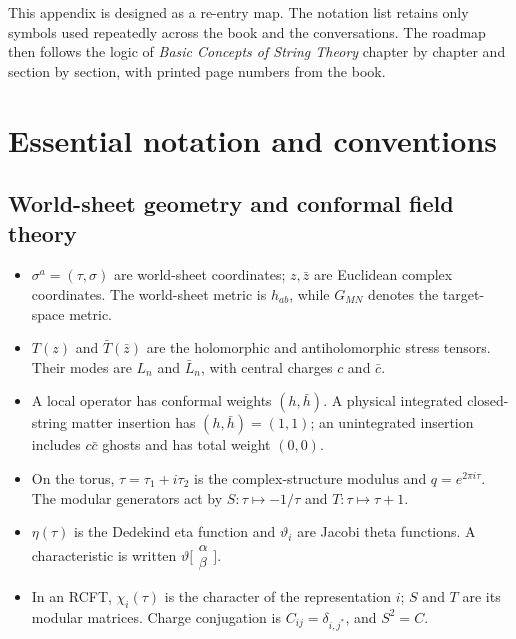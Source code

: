 \documentclass[
  10pt,
  a4paper,
  openany]{book}
\providecommand{\tightlist}{%
  \setlength{\itemsep}{0pt}\setlength{\parskip}{0pt}}
\begin{document}
This appendix is designed as a re-entry map. The notation list retains
only symbols used repeatedly across the book and the conversations. The
roadmap then follows the logic of \emph{Basic Concepts of String Theory}
chapter by chapter and section by section, with printed page numbers
from the book.

\section{Essential notation and
conventions}\label{essential-notation-and-conventions}

\subsection{World-sheet geometry and conformal field
theory}\label{world-sheet-geometry-and-conformal-field-theory}

\begin{itemize}
\tightlist
\item
  \(\sigma^a=(\tau,\sigma)\) are world-sheet coordinates; \(z,\bar z\)
  are Euclidean complex coordinates. The world-sheet metric is
  \(h_{ab}\), while \(G_{MN}\) denotes the target-space metric.
\item
  \(T(z)\) and \(\bar T(\bar z)\) are the holomorphic and
  antiholomorphic stress tensors. Their modes are \(L_n\) and
  \(\bar L_n\), with central charges \(c\) and \(\bar c\).
\item
  A local operator has conformal weights \((h,\bar h)\). A physical
  integrated closed-string matter insertion has \((h,\bar h)=(1,1)\); an
  unintegrated insertion includes \(c\bar c\) ghosts and has total
  weight \((0,0)\).
\item
  On the torus, \(\tau=\tau_1+i\tau_2\) is the complex-structure modulus
  and \(q=e^{2\pi i\tau}\). The modular generators act by
  \(S:\tau\mapsto-1/\tau\) and \(T:\tau\mapsto\tau+1\).
\item
  \(\eta(\tau)\) is the Dedekind eta function and \(\vartheta_i\) are
  Jacobi theta functions. A characteristic is written
  \(\vartheta\bigl[\begin{smallmatrix}\alpha\\\beta\end{smallmatrix}\bigr]\).
\item
  In an RCFT, \(\chi_i(\tau)\) is the character of the representation
  \(i\); \(S\) and \(T\) are its modular matrices. Charge conjugation is
  \(C_{ij}=\delta_{i,j^*}\), and \(S^2=C\).
\end{itemize}
\end{document}
